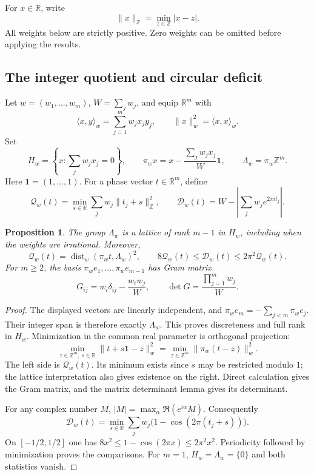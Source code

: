 \documentclass[11pt,a4paper]{article}
\newtheorem{proposition}[theorem]{Proposition}
\theoremstyle{definition}\newtheorem{definition}[theorem]{Definition}
\theoremstyle{remark}\newtheorem{remark}[theorem]{Remark}
\newcommand{\R}{\mathbb R}\newcommand{\Z}{\mathbb Z}
\numberwithin{equation}{section}
\begin{document}
For $x\in\R$, write
\[
 \|x\|_{\Z}=\min_{z\in\Z}|x-z|.
\]
All weights below are strictly positive.  Zero weights can be omitted
before applying the results.

\subsection{The integer quotient and circular deficit}

Let $w=(w_1,\ldots,w_m)$, $W=\sum_jw_j$, and equip $\R^m$ with
\[
 \langle x,y\rangle_w=\sum_{j=1}^m w_jx_jy_j,
 \qquad \|x\|_w^2=\langle x,x\rangle_w.
\]
Set
\begin{equation}\label{r4c:lattice}
 H_w=\left\{x:\sum_jw_jx_j=0\right\},\qquad
 \pi_wx=x-\frac{\sum_jw_jx_j}{W}\mathbf 1,
 \qquad \Lambda_w=\pi_w\Z^m.
\end{equation}
Here $\mathbf 1=(1,\ldots,1)$.  For a phase vector $t\in\R^m$, define
\begin{equation}\label{r4c:QD}
 \mathcal Q_w(t)=\min_{s\in\R}\sum_jw_j\|t_j+s\|_{\Z}^2,
 \qquad
 \mathcal D_w(t)=W-\left|\sum_jw_je^{2\pi i t_j}\right|.
\end{equation}

\begin{proposition}\label{r4c:bridge}
The group $\Lambda_w$ is a lattice of rank $m-1$ in $H_w$, including
when the weights are irrational.  Moreover,
\begin{equation}\label{r4c:distance}
 \mathcal Q_w(t)=\operatorname{dist}_w(\pi_wt,\Lambda_w)^2,
 \qquad
 8\mathcal Q_w(t)\leq\mathcal D_w(t)
       \leq2\pi^2\mathcal Q_w(t).
\end{equation}
For $m\geq2$, the basis $\pi_we_1,\ldots,\pi_we_{m-1}$ has Gram matrix
\begin{equation}\label{r4c:gram}
 G_{ij}=w_i\delta_{ij}-\frac{w_iw_j}{W},
 \qquad \det G=\frac{\prod_{j=1}^m w_j}{W}.
\end{equation}
\end{proposition}

\begin{proof}
The displayed vectors are linearly independent, and
$\pi_we_m=-\sum_{j<m}\pi_we_j$.  Their integer span is therefore
exactly $\Lambda_w$.  This proves discreteness and full rank in $H_w$.
Minimization in the common real parameter is orthogonal projection:
\[
 \min_{z\in\Z^m,\ s\in\R}
       \|t+s\mathbf1-z\|_w^2
   =\min_{z\in\Z^m}\|\pi_w(t-z)\|_w^2.
\]
The left side is $\mathcal Q_w(t)$.  Its minimum exists since $s$ may
be restricted modulo $1$; the lattice interpretation also gives
existence on the right.  Direct calculation gives the Gram matrix, and
the matrix determinant lemma gives its determinant.

For any complex number $M$, $|M|=\max_\alpha\Re(e^{i\alpha}M)$.
Consequently
\[
 \mathcal D_w(t)
   =\min_{s\in\R}\sum_jw_j\bigl(1-\cos(2\pi(t_j+s))\bigr).
\]
On $[-1/2,1/2]$ one has
$8x^2\leq1-\cos(2\pi x)\leq2\pi^2x^2$.
Periodicity followed by minimization proves the comparisons.
For $m=1$, $H_w=\Lambda_w=\{0\}$ and both statistics vanish.
\end{proof}
\end{document}

